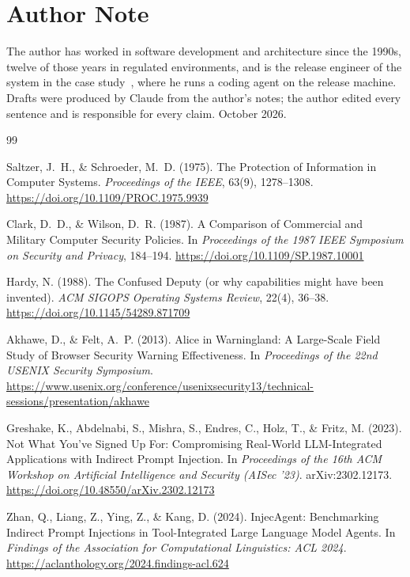 \documentclass[11pt]{article}
\theoremstyle{definition}
\begin{document}
\section*{Author Note}

The author has worked in software development and architecture since the 1990s, twelve of those years in regulated environments, and is the release engineer of the system in the case study~\cite{CaseStudy}, where he runs a coding agent on the release machine. Drafts were produced by Claude from the author's notes; the author edited every sentence and is responsible for every claim. October 2026.

\begin{thebibliography}{99}
\raggedright

Saltzer, J.~H., \& Schroeder, M.~D. (1975). The Protection of Information in Computer Systems. \textit{Proceedings of the IEEE}, 63(9), 1278--1308. \url{https://doi.org/10.1109/PROC.1975.9939}

Clark, D.~D., \& Wilson, D.~R. (1987). A Comparison of Commercial and Military Computer Security Policies. In \textit{Proceedings of the 1987 IEEE Symposium on Security and Privacy}, 184--194. \url{https://doi.org/10.1109/SP.1987.10001}

Hardy, N. (1988). The Confused Deputy (or why capabilities might have been invented). \textit{ACM SIGOPS Operating Systems Review}, 22(4), 36--38. \url{https://doi.org/10.1145/54289.871709}

Akhawe, D., \& Felt, A.~P. (2013). Alice in Warningland: A Large-Scale Field Study of Browser Security Warning Effectiveness. In \textit{Proceedings of the 22nd USENIX Security Symposium}. \url{https://www.usenix.org/conference/usenixsecurity13/technical-sessions/presentation/akhawe}

Greshake, K., Abdelnabi, S., Mishra, S., Endres, C., Holz, T., \& Fritz, M. (2023). Not What You've Signed Up For: Compromising Real-World LLM-Integrated Applications with Indirect Prompt Injection. In \textit{Proceedings of the 16th ACM Workshop on Artificial Intelligence and Security (AISec '23)}. arXiv:2302.12173. \url{https://doi.org/10.48550/arXiv.2302.12173}

Zhan, Q., Liang, Z., Ying, Z., \& Kang, D. (2024). InjecAgent: Benchmarking Indirect Prompt Injections in Tool-Integrated Large Language Model Agents. In \textit{Findings of the Association for Computational Linguistics: ACL 2024}. \url{https://aclanthology.org/2024.findings-acl.624}


\end{thebibliography}
\end{document}
